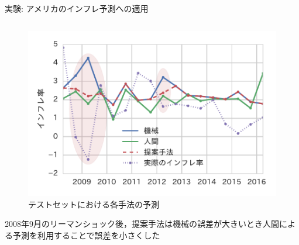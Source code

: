 \documentclass[dvipdfmx]{beamer}
\begin{document}
\begin{frame}{}
\begin{block}{実験: アメリカのインフレ予測への適用}
\begin{columns}
\begin{column}{.49\textwidth}
\begin{figure}
          \includegraphics[width=.85\columnwidth]{poster-behavior.pdf}
          \caption{テストセットにおける各手法の予測}
          \centering
        \end{figure}
        \begin{itembox}[l]{}
          \alert{2008年9月のリーマンショック後，提案手法は機械の誤差が大きいとき人間による予測を利用することで誤差を小さくした}
        \end{itembox}
      \end{column}
    \end{columns}
  \end{block}
\end{frame}
\end{document}
